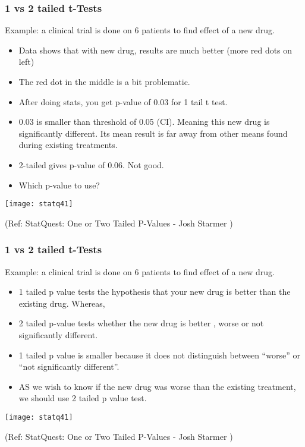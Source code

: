 \begin{frame}[fragile]\frametitle{1 vs 2 tailed t-Tests}
Example: a clinical trial is done on 6 patients to find effect of a new drug.


	\begin{itemize}
	\item Data shows that with new drug, results are much better (more red dots on left)
	\item The red dot in the middle is a bit problematic.
	\item After doing stats, you get p-value of 0.03 for 1 tail t test. 
	\item 0.03 is smaller than threshold of 0.05 (CI). Meaning this new drug is significantly different. Its mean result is far away from other means found during existing treatments.
	\item 2-tailed gives p-value of 0.06. Not good.
	\item Which p-value to use?
	\end{itemize}

      \begin{center}
      \texttt{[image: statq41]}
	  	\end{center}

\tiny{(Ref: StatQuest: One or Two Tailed P-Values - Josh Starmer )}
\end{frame}

\begin{frame}[fragile]\frametitle{1 vs 2 tailed t-Tests}
Example: a clinical trial is done on 6 patients to find effect of a new drug.


	\begin{itemize}
	\item 1 tailed p value tests the hypothesis that your new drug is better than the existing drug. Whereas,
	\item 2 tailed p-value tests whether the new drug is better , worse or not significantly different.
	\item 1 tailed p value is smaller because it does not distinguish between ``worse'' or ``not significantly different''.
	\item AS we wish to know if the new drug was worse than the existing treatment, we should use 2 tailed p value test.
	\end{itemize}

      \begin{center}
      \texttt{[image: statq41]}
	  	\end{center}

\tiny{(Ref: StatQuest: One or Two Tailed P-Values - Josh Starmer )}
\end{frame}


